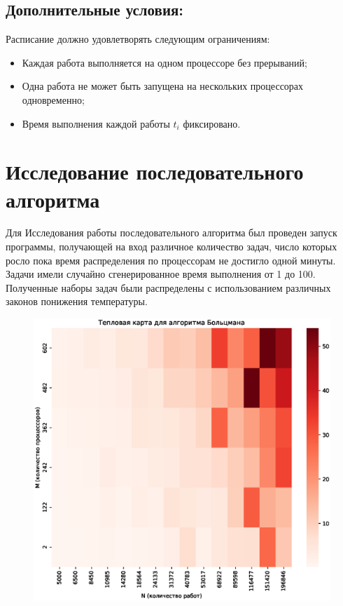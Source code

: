 \documentclass[openany, twoside, a4paper, 12pt]{extbook}
\begin{document}
	\subsection*{Дополнительные условия:}
	
	Расписание должно удовлетворять следующим ограничениям:
	\begin{itemize}
	    \item Каждая работа выполняется на одном процессоре без прерываний;
	    \item Одна работа не может быть запущена на нескольких процессорах одновременно;
	    \item Время выполнения каждой работы \( t_i \) фиксировано.
	\end{itemize}
	\section*{Исследование последовательного алгоритма}
	Для Исследования работы последовательного алгоритма
	был проведен запуск программы, получающей на вход 
	различное количество задач, число которых росло пока время распределения по процессорам
	не достигло одной минуты.
	Задачи имели случайно сгенерированное время выполнения от 1 до 100.
	Полученные наборы задач были распределены с использованием различных законов понижения температуры.

	\begin{figure}[H]
	    \centering
	    \includegraphics[width=\textwidth]{boltzmann_heatmap.eps}
	    \label{fig:boltzmann}
	\end{figure}
	
\end{document}
